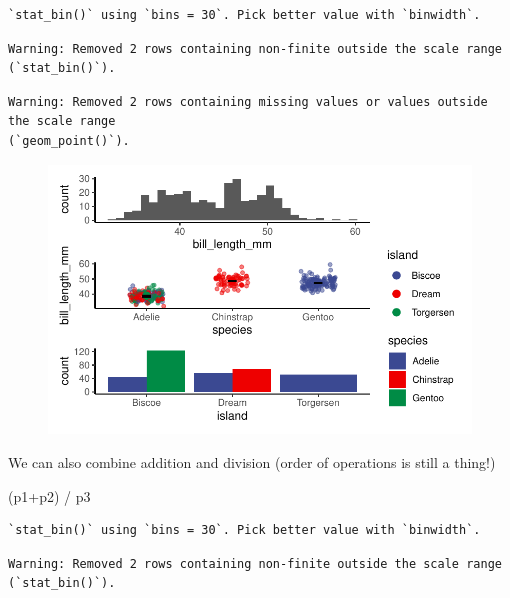 \documentclass[
  letterpaper,
  DIV=11,
  numbers=noendperiod]{scrartcl}
\newenvironment{Shaded}{\begin{snugshade}}{\end{snugshade}}
\newcommand{\NormalTok}[1]{\textcolor[rgb]{0.00,0.23,0.31}{#1}}
\newcommand{\SpecialCharTok}[1]{\textcolor[rgb]{0.37,0.37,0.37}{#1}}
\begin{document}
\begin{verbatim}
`stat_bin()` using `bins = 30`. Pick better value with `binwidth`.
\end{verbatim}

\begin{verbatim}
Warning: Removed 2 rows containing non-finite outside the scale range
(`stat_bin()`).
\end{verbatim}

\begin{verbatim}
Warning: Removed 2 rows containing missing values or values outside the scale range
(`geom_point()`).
\end{verbatim}

\begin{figure}[H]

{\centering \includegraphics{Lab_2_files/figure-pdf/unnamed-chunk-39-1.pdf}

}

\end{figure}

We can also combine addition and division (order of operations is still
a thing!)

\begin{Shaded}
\begin{Highlighting}[]
\NormalTok{(p1}\SpecialCharTok{+}\NormalTok{p2) }\SpecialCharTok{/}\NormalTok{ p3}
\end{Highlighting}
\end{Shaded}

\begin{verbatim}
`stat_bin()` using `bins = 30`. Pick better value with `binwidth`.
\end{verbatim}

\begin{verbatim}
Warning: Removed 2 rows containing non-finite outside the scale range
(`stat_bin()`).
\end{verbatim}
\end{document}
